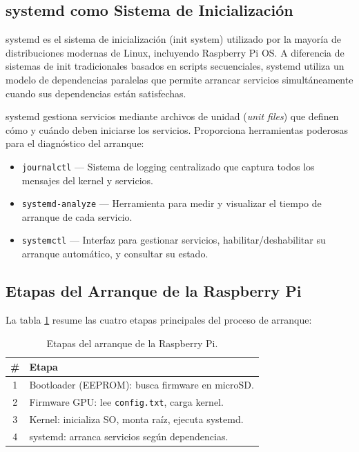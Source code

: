 \documentclass[conference]{IEEEtran}
\begin{document}
\subsection{systemd como Sistema de Inicialización}

systemd es el sistema de inicialización (init system) utilizado por la mayoría de distribuciones modernas de Linux, incluyendo Raspberry Pi OS. A diferencia de sistemas de init tradicionales basados en scripts secuenciales, systemd utiliza un modelo de dependencias paralelas que permite arrancar servicios simultáneamente cuando sus dependencias están satisfechas.

systemd gestiona servicios mediante archivos de unidad (\textit{unit files}) que definen cómo y cuándo deben iniciarse los servicios. Proporciona herramientas poderosas para el diagnóstico del arranque:

\begin{itemize}
	\item \texttt{journalctl} — Sistema de logging centralizado que captura todos los mensajes del kernel y servicios.
	\item \texttt{systemd-analyze} — Herramienta para medir y visualizar el tiempo de arranque de cada servicio.
	\item \texttt{systemctl} — Interfaz para gestionar servicios, habilitar/deshabilitar su arranque automático, y consultar su estado.
\end{itemize}

\subsection{Etapas del Arranque de la Raspberry Pi}

La tabla \ref{tab:boot_stages} resume las cuatro etapas principales del proceso de arranque:

\begin{table}[H]
	\centering
	\caption{Etapas del arranque de la Raspberry Pi.}
	\label{tab:boot_stages}
	\small
	\begin{tabular}{|c|p{5.5cm}|}
		\hline
		\textbf{\#} & \textbf{Etapa} \\
		\hline
		1 & Bootloader (EEPROM): busca firmware en microSD. \\
		\hline
		2 & Firmware GPU: lee \texttt{config.txt}, carga kernel. \\
		\hline
		3 & Kernel: inicializa SO, monta raíz, ejecuta systemd. \\
		\hline
		4 & systemd: arranca servicios según dependencias. \\
		\hline
	\end{tabular}
\end{table}
\end{document}
